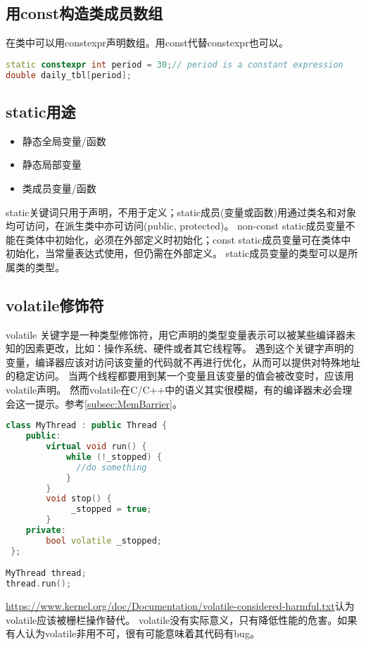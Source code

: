 \subsection{用const构造类成员数组}
在类中可以用constexpr声明数组。用const代替constexpr也可以。
\begin{lstlisting}[language=C++]
static constexpr int period = 30;// period is a constant expression
double daily_tbl[period];
\end{lstlisting}

\subsection{static用途}
\begin{itemize}
    \item 静态全局变量/函数
    \item 静态局部变量
    \item 类成员变量/函数
\end{itemize}


static关键词只用于声明，不用于定义；static成员(变量或函数)用通过类名和对象均可访问，在派生类中亦可访问(public, protected)。
non-const static成员变量不能在类体中初始化，必须在外部定义时初始化；const static成员变量可在类体中初始化，当常量表达式使用，但仍需在外部定义。
static成员变量的类型可以是所属类的类型。

\subsection{volatile修饰符}
 volatile 关键字是一种类型修饰符，用它声明的类型变量表示可以被某些编译器未知的因素更改，比如：操作系统、硬件或者其它线程等。
 遇到这个关键字声明的变量，编译器应该对访问该变量的代码就不再进行优化，从而可以提供对特殊地址的稳定访问。
 当两个线程都要用到某一个变量且该变量的值会被改变时，应该用volatile声明。
 然而volatile在C/C++中的语义其实很模糊，有的编译器未必会理会这一提示。参考\ref{subsec:MemBarrier}。

\begin{lstlisting}[language=C++]
class MyThread : public Thread {
	public:
		virtual void run() {
			while (!_stopped) {
			  //do something
			}
	    }
		void stop() {
			 _stopped = true;
		}
	private:
		bool volatile _stopped;
 };

MyThread thread;
thread.run();
\end{lstlisting}

\url{https://www.kernel.org/doc/Documentation/volatile-considered-harmful.txt}认为volatile应该被栅栏操作替代。
volatile没有实际意义，只有降低性能的危害。如果有人认为volatile非用不可，很有可能意味着其代码有bug。




